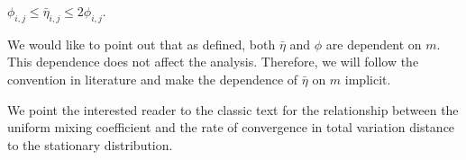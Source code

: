 \documentclass[opre,sglanonrev]{informs4}
\numberwithin{equation}{section}
\begin{document}
{{\begin{lemma}
 $   \phi_{i,j}\leq \bar\eta_{i,j}\leq 2\phi_{i,j}.$
\end{lemma}
\begin{remark}
    We would like to point out that as defined, both $\bar \eta$ and $\phi$ are dependent on $m$. This dependence does not affect the analysis. Therefore, we will follow the convention in literature \citep{kontorovich2008concentration} and make the dependence of $\bar \eta$ on $m$ implicit. %
\end{remark}
\begin{remark}
    We point the interested reader to the classic text \citep[Theorem 3.1]{bradley} for the relationship between the uniform mixing coefficient and the rate of convergence in total variation distance to the stationary distribution. 
\end{remark}
}

}
\end{document}

